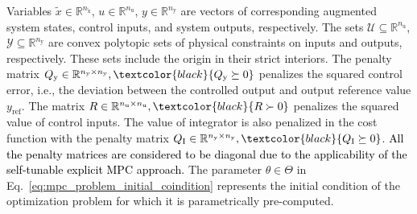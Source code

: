\documentclass[preprint,12pt]{elsarticle}
\newcommand{\change}[1]{\textcolor{black}{#1}}
\begin{document}
	Variables $\widetilde{x} \in \mathbb{R}^{n_{\widetilde{\mathrm{x}}}}$, $u \in \mathbb{R}^{n_{\mathrm{u}}}$, $y \in \mathbb{R}^{n_{\mathrm{y}}}$ are vectors of corresponding augmented system states, control inputs, and system outputs, respectively. 
	The sets $\mathcal{U} \subseteq \mathbb{R}^{n_{\mathrm{u}}}$, $\mathcal{Y} \subseteq \mathbb{R}^{n_{\mathrm{y}}}$ are convex polytopic sets of physical constraints on inputs and outputs, respectively. These sets include the origin in their strict interiors. The penalty matrix $Q_\mathrm{y} \in \mathbb{R}^{n_{\mathrm{y}} \times n_{\mathrm{y}}}, \change{Q_\mathrm{y} \succeq 0}$ penalizes the squared control error, i.e., the deviation between the controlled output and output reference value $y_\mathrm{ref}$. The matrix $R \in \mathbb{R}^{n_{\mathrm{u}} \times n_{\mathrm{u}}}, \change{R \succ 0}$ penalizes the squared value of control inputs. 
	The value of integrator is also penalized in the cost function with the penalty matrix $Q_\mathrm{I} \in \mathbb{R}^{n_{\mathrm{y}} \times n_{\mathrm{y}}}, \change{Q_\mathrm{I} \succeq 0}$. \change{All the penalty matrices are considered to be diagonal due to the applicability of the self-tunable explicit MPC approach.}
	The parameter $\theta \in \Theta$ in Eq.~\eqref{eq:mpc_problem_initial_coindition} represents the initial condition of the optimization problem for which it is parametrically pre-computed. 
	
\end{document}

